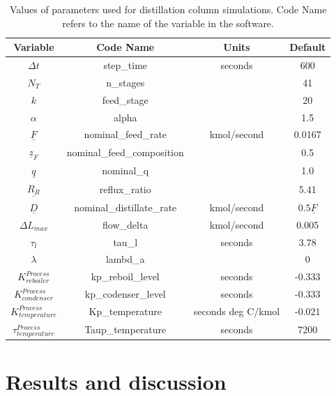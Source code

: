 \begin{table}[bt]
  \caption{Values of parameters used for distillation column simulations. Code Name refers to the name of the variable in the software.}
  \begin{tabular}{cccc}
    Variable & Code Name & Units & Default \\
    \hline
    $\Delta t$ & step\_time & seconds & 600  \\
    $N_T$ & n\_stages &  & 41 \\
    $k$ & feed\_stage & & 20  \\
    $\alpha$ & alpha & & 1.5  \\
    $\underline F$ & nominal\_feed\_rate & kmol/second & 0.0167  \\
    $\underline z_F$ & nominal\_feed\_composition & & 0.5   \\
    $\underline q$ & nominal\_q & & 1.0 \\
	$\underline{R_R}$ & reflux\_ratio & & 5.41 \\
	$\underline D$ & nominal\_distillate\_rate & kmol/second  & $0.5 \underline F$ \\
    $\Delta L_{max}$ & flow\_delta & kmol/second  & 0.005  \\
	$\tau_l$ & tau\_l  & seconds & 3.78  \\
	$\lambda$ & lambd\_a & & 0 \\
	$K^{Process}_{reboiler}$ & kp\_reboil\_level & seconds & -0.333  \\
	$K^{Process}_{condenser}$ & kp\_codenser\_level & seconds &  -0.333\\
	$K^{Process}_{temperature}$ & Kp\_temperature & seconds deg C/kmol & -0.021 \\
	$\tau^{Process}_{temperature}$ & Taup\_temperature & seconds & 7200 \\
  \end{tabular}

  \label{parameters_table}
\end{table}


\section{Results and discussion}

